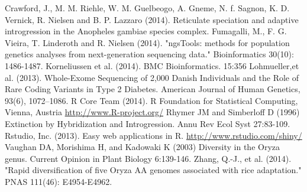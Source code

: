 \documentclass[final]{beamer}
\begin{document}
\begin{frame}[t]
\begin{multicols}{3}
\begin{thebibliography}{99}
 Crawford, J., M. M. Riehle, W. M. Guelbeogo, A. Gneme, N. f. Sagnon, K. D. Vernick, R. Nielsen and B. P. Lazzaro (2014). Reticulate speciation and adaptive introgression in the Anopheles gambiae species complex.
 Fumagalli, M., F. G. Vieira, T. Linderoth and R. Nielsen (2014). "ngsTools: methods for population genetics analyses from next-generation sequencing data." Bioinformatics 30(10): 1486-1487.
 Korneliussen et al. (2014). BMC Bioinformatics. 15:356
 Lohmueller,et al. (2013). Whole-Exome Sequencing of 2,000 Danish Individuals and the Role of Rare Coding Variants in Type 2 Diabetes. American Journal of Human Genetics, 93(6), 1072–1086.
 R Core Team (2014). R Foundation for Statistical Computing, Vienna, Austria \url{http://www.R-project.org/}
 Rhymer JM and Simberloff D (1996) Extinction by Hybridization and Introgression. Annu Rev Ecol Syst 27:83-109.
 Rstudio, Inc. (2013). Easy web applications in R. \url{http://www.rstudio.com/shiny/}
 Vaughan DA, Morishima H, and Kadowaki K (2003) Diversity in the Oryza genus. Current Opinion in Plant Biology 6:139-146.
 Zhang, Q.-J., et al. (2014). "Rapid diversification of five Oryza AA genomes associated with rice adaptation." PNAS 111(46): E4954-E4962.

\end{thebibliography}

\end{multicols}

\end{frame}
\end{document}
